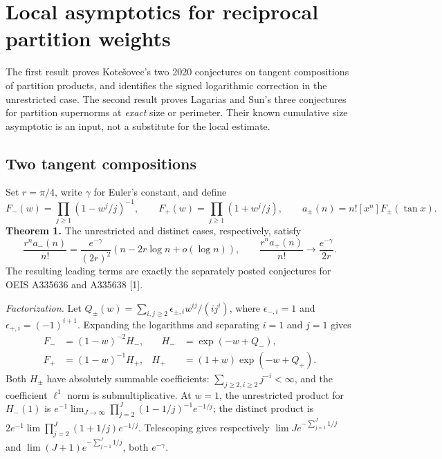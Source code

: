 \documentclass[11pt,a4paper]{article}
\numberwithin{equation}{section}
\theoremstyle{definition}
\theoremstyle{remark}
\begin{document}
\section{\texorpdfstring{Local asymptotics for reciprocal partition weights}{Local asymptotics for reciprocal partition weights}}\label{section:r40taisho}
\par\medskip

The first result proves Kote\v{s}ovec's two 2020 conjectures on tangent compositions of partition products, and identifies the signed logarithmic correction in the unrestricted case. The second result proves Lagarias and Sun's three conjectures for partition supernorms at \emph{exact} size or perimeter. Their known cumulative size asymptotic is an input, not a substitute for the local estimate.

\subsection*{Two tangent compositions}
Set $r=\pi/4$, write $\gamma$ for Euler's constant, and define
\[
 F_-(w)=\prod_{j\ge1}(1-w^j/j)^{-1},\qquad
 F_+(w)=\prod_{j\ge1}(1+w^j/j),\qquad
 a_\pm(n)=n![x^n]F_\pm(\tan x).
\]
\textbf{Theorem 1.} The unrestricted and distinct cases, respectively, satisfy
\[
 \frac{r^na_-(n)}{n!}=\frac{e^{-\gamma}}{(2r)^2}
               (n-2r\log n+o(\log n)),\qquad
 \frac{r^na_+(n)}{n!}\longrightarrow\frac{e^{-\gamma}}{2r}.
\]
The resulting leading terms are exactly the separately posted conjectures for OEIS A335636 and A335638 [1].

\textit{Factorization.} Let $Q_\pm(w)=\sum_{i,j\ge2}\epsilon_{\pm,i}w^{ij}/(i j^i)$, where $\epsilon_{-,i}=1$ and $\epsilon_{+,i}=(-1)^{i+1}$. Expanding the logarithms and separating $i=1$ and $j=1$ gives
\[
 \begin{aligned}
 F_-&=(1-w)^{-2}H_-,&\quad H_-&=\exp(-w+Q_-),\\
 F_+&=(1-w)^{-1}H_+,& H_+&=(1+w)\exp(-w+Q_+).
\end{aligned}
\]
Both $H_\pm$ have absolutely summable coefficients: $\sum_{j\ge2,i\ge2}j^{-i}<\infty$, and the coefficient $\ell^1$ norm is submultiplicative. At $w=1$, the unrestricted product for $H_-(1)$ is $e^{-1}\lim_{J\to\infty}\prod_{j=2}^J(1-1/j)^{-1}e^{-1/j}$; the distinct product is $2e^{-1}\lim\prod_{j=2}^J(1+1/j)e^{-1/j}$. Telescoping gives respectively $\lim J e^{-\sum_{j=1}^J1/j}$ and $\lim (J+1)e^{-\sum_{j=1}^J1/j}$, both $e^{-\gamma}$.
\end{document}
